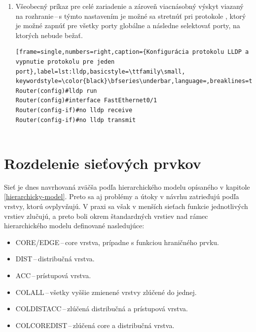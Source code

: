 \begin{enumerate}
\begin{minipage}{\linewidth}		
\begin{lstlisting}[frame=single,numbers=right,caption={Konfigurácia autentizácie OSPF na porte alebo v proccese},label=lst:ospf-auth,basicstyle=\ttfamily\small, keywordstyle=\color{black}\bfseries\underbar,language=,breaklines=true]
Router(config)#interface FastEthernet0/1
Router(config-if)#ip ospf message-digest-key 1 md5 heslo
Router(config-if)#ip ospf authentication message-digest
Router(config)#router ospf 1
Router(config)#area 0 authentication message-digest
Router(config)#area 0 authentication key-chain 1
\end{lstlisting}
\end{minipage}
	
	
	\item \vspace{2em} Všeobecný príkaz pre celé zariadenie a zároveň viacnásobný výskyt viazaný na rozhranie\,--\,s týmto nastavením je možné sa stretnúť pri protokole , ktorý je možné zapnúť pre všetky porty globálne a následne selektovať porty, na ktorých nebude bežať.
	
\begin{minipage}{\linewidth}		
\begin{lstlisting}[frame=single,numbers=right,caption={Konfigurácia protokolu LLDP a vypnutie protokolu pre jeden port},label=lst:lldp,basicstyle=\ttfamily\small, keywordstyle=\color{black}\bfseries\underbar,language=,breaklines=true]
Router(config)#lldp run
Router(config)#interface FastEthernet0/1
Router(config-if)#no lldp receive
Router(config-if)#no lldp transmit
		

\end{lstlisting}
\end{minipage}
	
\end{enumerate}

\section{Rozdelenie sieťových prvkov}
\label{hierarchydesign}
Sieť je dnes navrhovaná zväčša podľa hierarchického modelu opísaného v kapitole \ref{hierarchicky-model}. Preto sa aj problémy a útoky v návrhu zatrieďujú podľa vrstvy, ktorú ovplyvňujú. V praxi sa však v menších sieťach funkcie jednotlivých vrstiev zlučujú, a preto boli okrem štandardných vrstiev nad rámec hierarchického modelu definované nasledujúce:

\begin{itemize}
	\item CORE/EDGE\,--\,core vrstva, prípadne s funkciou hraničného prvku.
	\item DIST\,--\,distribučná vrstva.
	\item ACC\,--\,prístupová vrstva.
	\item COLALL\,--\,všetky vyššie zmienené vrstvy zlúčené do jednej.
	\item COLDISTACC\,--\,zlúčená distribučná a prístupová vrstva.
	\item COLCOREDIST\,--\,zlúčená core a distribučná vrstva.
\end{itemize}

